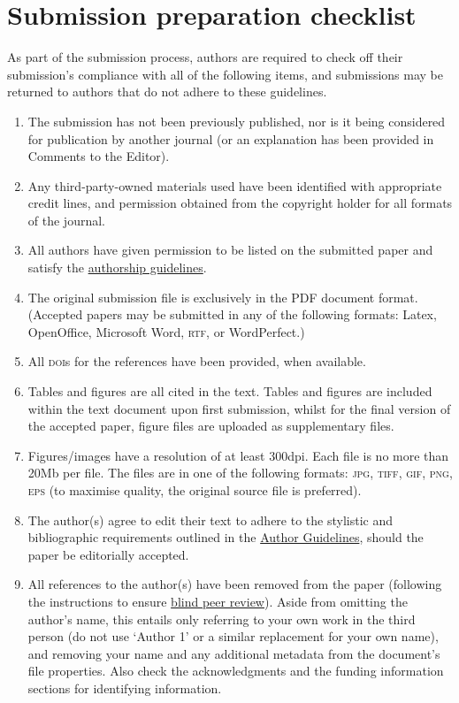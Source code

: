\documentclass[charis,linguex,biblatex]{glossa}
\begin{document}
\section{Submission preparation checklist}

As part of the submission process, authors are required to check off their submission's compliance with all of the following items, and submissions may be returned to authors that do not adhere to these guidelines.

\begin{enumerate}[label=\arabic*.]
\item The submission has not been previously published, nor is it being considered for publication by another journal (or an explanation has been provided in Comments to the Editor).
\item Any third-party-owned materials used have been identified with appropriate credit lines, and permission obtained from the copyright holder for all formats of the journal.
\item All authors have given permission to be listed on the submitted paper and satisfy the \href{http://glossa.ubiquitypress.com/about/authorship/}{authorship guidelines}. 
\item The original submission file is exclusively in the PDF document format. (Accepted papers may be submitted in any of the following formats: Latex, OpenOffice, Microsoft Word, \textsc{rtf}, or WordPerfect.)
\item All \textsc{doi}s for the references have been provided, when available.
\item Tables and figures are all cited in the text. Tables and figures are included within the text document upon first submission, whilst for the final version of the accepted paper, figure files are uploaded as supplementary files.
\item Figures/images have a resolution of at least 300dpi. Each file is no more than 20Mb per file. The files are in one of the following formats: \textsc{jpg, tiff, gif, png, eps} (to maximise quality, the original source file is preferred).
\item The author(s) agree to edit their text to adhere to the stylistic and bibliographic requirements outlined in the \href{https://www.glossa-journal.org/about/submissions#authorGuidelines}{Author Guidelines}, should the paper be editorially accepted.
\item All references to the author(s) have been removed from the paper (following the instructions to ensure \href{https://www.glossa-journal.org/help/view/editorial/topic/000044}{blind peer review}). Aside from omitting the author’s name, this entails only referring to your own work in the third person (do not use `Author 1’ or a similar replacement for your own name), and removing your name and any additional metadata from the document’s file properties. Also check the acknowledgments and the funding information sections for identifying information.
\end{enumerate}
\end{document}
